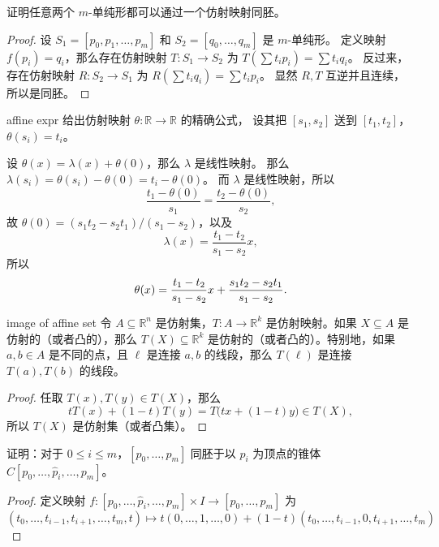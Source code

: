 \documentclass[fontset=none]{Notes}
\begin{document}
\begin{problem}{}{}
  证明任意两个 $m$-单纯形都可以通过一个仿射映射同胚。
\end{problem}
\begin{proof}
  设 $S_1=[p_0,p_1,\dots,p_m]$ 和 $S_2=[q_0,\dots,q_m]$ 是 $m$-单纯形。
  定义映射 $f(p_i)=q_i$，那么存在仿射映射
  $T:S_1\to S_2$ 为 $T(\sum t_ip_i)=\sum t_iq_i$。
  反过来，存在仿射映射 $R:S_2\to S_1$ 为 $R(\sum t_iq_i)=\sum t_ip_i$。
  显然 $R,T$ 互逆并且连续，所以是同胚。
\end{proof}

\begin{problem}{}{affine expr}
  给出仿射映射 $\theta:\mathbb{R}\to \mathbb{R}$ 的精确公式，
  设其把 $[s_1,s_2]$ 送到 $[t_1,t_2]$，$\theta(s_i)=t_i$。
\end{problem}
\begin{solution}
  设 $\theta(x)=\lambda(x)+\theta(0)$，那么 $\lambda$ 是线性映射。
  那么 $\lambda(s_i)=\theta(s_i)-\theta(0)=t_i-\theta(0)$。
  而 $\lambda$ 是线性映射，所以
  \[
    \frac{t_1-\theta(0)}{s_1}=\frac{t_2-\theta(0)}{s_2},
  \]
  故 $\theta(0)=(s_1t_2-s_2t_1)/(s_1-s_2)$，以及
  \[
    \lambda(x)=\frac{t_1-t_2}{s_1-s_2}x,
  \]
  所以
  \[
    \theta(x)=\frac{t_1-t_2}{s_1-s_2}x+\frac{s_1t_2-s_2t_1}{s_1-s_2}.\qedhere
  \]
\end{solution}

\begin{problem}{}{image of affine set}
  令 $A\subseteq \mathbb{R}^n$ 是仿射集，$T:A\to \mathbb{R}^k$
  是仿射映射。如果 $X\subseteq A$ 是仿射的（或者凸的），那么
  $T(X)\subseteq \mathbb{R}^k$ 是仿射的（或者凸的）。特别地，如果 
  $a,b\in A$ 是不同的点，且 $\ell$ 是连接 $a,b$ 的线段，那么
  $T(\ell)$ 是连接 $T(a),T(b)$ 的线段。 
\end{problem}
\begin{proof}
  任取 $T(x),T(y)\in T(X)$，那么
  \[
    tT(x)+(1-t)T(y)=T\bigl(tx+(1-t)y\bigr)\in T(X),
  \]
  所以 $T(X)$ 是仿射集（或者凸集）。
\end{proof}

\begin{problem}{}{}
  证明：对于 $0\leq i\leq m$，$[p_0,\dots,p_m]$ 同胚于以 $p_i$
  为顶点的锥体 $C[p_0,\dots,\hat p_i,\dots,p_m]$。
\end{problem}
\begin{proof}
  定义映射 $f:[p_0,\dots,\hat p_i,\dots,p_m]\times I\to [p_0,\dots,p_m]$ 为
  \[
    \left(t_0,\dots,t_{i-1},t_{i+1},\dots,t_m,t\right)
    \mapsto t(0,\dots,1,\dots,0)+(1-t)\left(t_0,\dots,t_{i-1},0,t_{i+1},\dots,t_m\right)
  \]
\end{proof}
\end{document}
